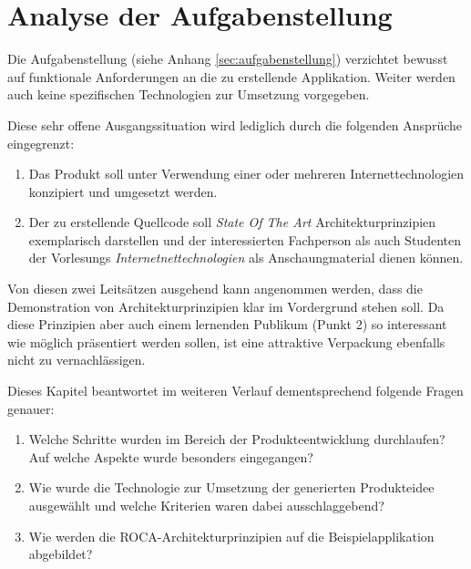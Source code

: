 \chapter{Analyse der Aufgabenstellung}

Die Aufgabenstellung (siehe Anhang \ref{sec:aufgabenstellung}) verzichtet bewusst auf funktionale Anforderungen an die zu erstellende Applikation. Weiter werden auch keine spezifischen Technologien zur Umsetzung vorgegeben.

Diese sehr offene Ausgangssituation wird lediglich durch die folgenden Ansprüche eingegrenzt:

\begin{enumerate}
	\item Das Produkt soll unter Verwendung einer oder mehreren Internettechnologien konzipiert und umgesetzt werden.
	\item Der zu erstellende Quellcode soll \emph{State Of The Art} Architekturprinzipien \cite{ROCA} exemplarisch darstellen und der interessierten Fachperson als auch Studenten der Vorlesungs \emph{Internetnettechnologien} als Anschaungmaterial dienen können.
\end{enumerate}

Von diesen zwei Leitsätzen ausgehend kann angenommen werden, dass die Demonstration von Architekturprinzipien klar im Vordergrund stehen soll. Da diese Prinzipien aber auch einem lernenden Publikum (Punkt 2) so interessant wie möglich präsentiert werden sollen, ist eine attraktive Verpackung ebenfalls nicht zu vernachlässigen.

Dieses Kapitel beantwortet im weiteren Verlauf dementsprechend folgende Fragen genauer:

\begin{enumerate}
	\item Welche Schritte wurden im Bereich der Produkteentwicklung durchlaufen? Auf welche Aspekte wurde besonders eingegangen?
	\item Wie wurde die Technologie zur Umsetzung der generierten Produkteidee ausgewählt und welche Kriterien waren dabei ausschlaggebend?
	\item Wie werden die ROCA-Architekturprinzipien auf die Beispielapplikation abgebildet?
\end{enumerate}





